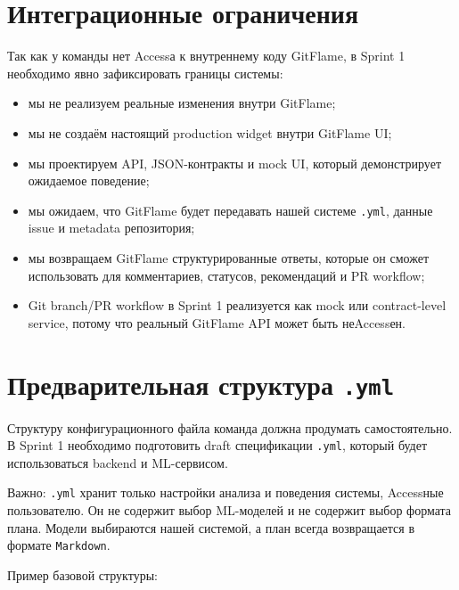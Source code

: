 \documentclass[12pt,a4paper]{article}
\begin{document}
\section{Интеграционные ограничения}

Так как у команды нет Accessа к внутреннему коду GitFlame, в Sprint 1 необходимо явно зафиксировать границы системы:

\begin{itemize}
    \item мы не реализуем реальные изменения внутри GitFlame;
    \item мы не создаём настоящий production widget внутри GitFlame UI;
    \item мы проектируем API, JSON-контракты и mock UI, который демонстрирует ожидаемое поведение;
    \item мы ожидаем, что GitFlame будет передавать нашей системе \texttt{.yml}, данные issue и metadata репозитория;
    \item мы возвращаем GitFlame структурированные ответы, которые он сможет использовать для комментариев, статусов, рекомендаций и PR workflow;
    \item Git branch/PR workflow в Sprint 1 реализуется как mock или contract-level service, потому что реальный GitFlame API может быть неAccessен.
\end{itemize}

\section{Предварительная структура \texttt{.yml}}

Структуру конфигурационного файла команда должна продумать самостоятельно. В Sprint 1 необходимо подготовить draft спецификации \texttt{.yml}, который будет использоваться backend и ML-сервисом.

Важно: \texttt{.yml} хранит только настройки анализа и поведения системы, Accessные пользователю. Он не содержит выбор ML-моделей и не содержит выбор формата плана. Модели выбираются нашей системой, а план всегда возвращается в формате \texttt{Markdown}.

Пример базовой структуры:
\end{document}
